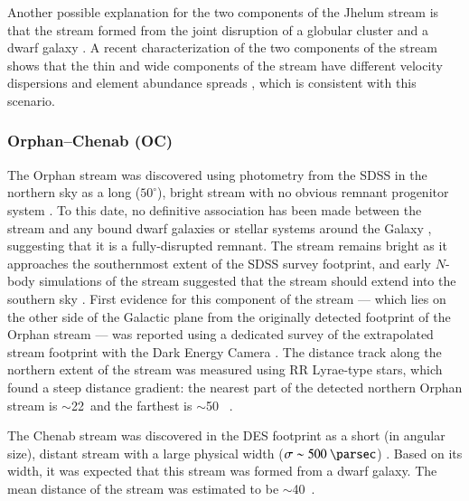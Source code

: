 \documentclass[final,5p,times,twocolumn,authoryear]{elsarticle}
\begin{document}
Another possible explanation for the two components of the Jhelum stream is that the
stream formed from the joint disruption of a globular cluster and a dwarf galaxy
\citep{bonaca:2019}.
A recent characterization of the two components of the stream shows that the thin and
wide components of the stream have different velocity dispersions and element abundance
spreads \citep{awad:2024}, which is consistent with this scenario.




\subsubsection{Orphan--Chenab (OC)}
\label{sec:oc}

The Orphan stream was discovered using photometry from the SDSS in the northern sky as a
long ($50^\circ$), bright stream with no obvious remnant progenitor system
\citep{belokurov:2006, grillmair:2006-orphan, belokurov:2007}.
To this date, no definitive association has been made between the stream and any bound
dwarf galaxies or stellar systems around the Galaxy \citep{fellhauer:2007, newberg:2010,
casey:2013, casey:2014, grillmair:2015}, suggesting that it is a fully-disrupted
remnant.
The stream remains bright as it approaches the southernmost extent of the SDSS survey
footprint, and early $N$-body simulations of the stream suggested that the stream should
extend into the southern sky \citep[e.g.,][]{sales:2008}.
First evidence for this component of the stream --- which lies on the other side of the
Galactic plane from the originally detected footprint of the Orphan stream --- was
reported using a dedicated survey of the extrapolated stream footprint with the Dark
Energy Camera \citep{grillmair:2015}.
The distance track along the northern extent of the stream was measured using RR
Lyrae-type stars, which found a steep distance gradient: the nearest part of the
detected northern Orphan stream is $\sim$22~\kpc and the farthest is $\sim$50~\kpc
\citep{sesar:2013, hendel:2018}.

The Chenab stream was discovered in the DES footprint as a short (in angular size),
distant stream with a large physical width ($\sigma \sim 500~\unit{\parsec}$)
\citep{shipp:2018}. Based on its width, it was expected that this stream was formed from
a dwarf galaxy. The mean distance of the stream was estimated to be $\sim$40~\kpc.
\end{document}
